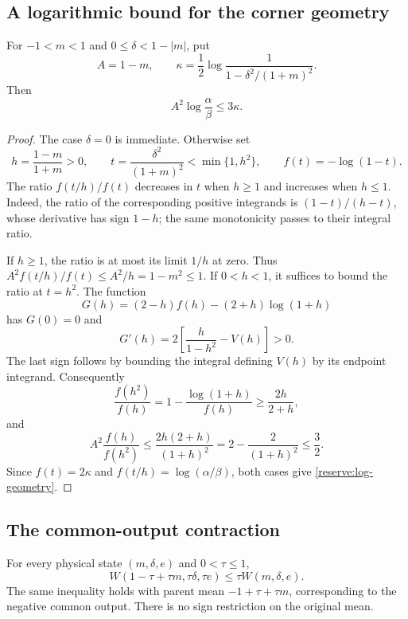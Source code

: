 \subsection{A logarithmic bound for the corner geometry}

\begin{lemma}
\label{reserve:geometry}
For $-1<m<1$ and $0\le\delta<1-|m|$, put
\[
 A=1-m,\qquad
 \kappa=\frac12\log\frac1{1-\delta^2/(1+m)^2}.
\]
Then
\begin{equation}
 A^2\log\frac\alpha\beta\le3\kappa.
 \label{reserve:log-geometry}
\end{equation}
\end{lemma}

\begin{proof}
The case $\delta=0$ is immediate.  Otherwise set
\[
 h=\frac{1-m}{1+m}>0,\qquad
 t=\frac{\delta^2}{(1+m)^2}<\min\{1,h^2\},\qquad
 f(t)=-\log(1-t).
\]
The ratio $f(t/h)/f(t)$ decreases in $t$ when $h\ge1$ and
increases when $h\le1$.  Indeed, the ratio of the corresponding
positive integrands is $(1-t)/(h-t)$, whose derivative has sign
$1-h$; the same monotonicity passes to their integral ratio.

If $h\ge1$, the ratio is at most its limit $1/h$ at zero.
Thus $A^2f(t/h)/f(t)\le A^2/h=1-m^2\le1$.
If $0<h<1$, it suffices to bound the ratio at $t=h^2$.
The function
\[
 G(h)=(2-h)f(h)-(2+h)\log(1+h)
\]
has $G(0)=0$ and
\[
 G'(h)=2\left[\frac h{1-h^2}-V(h)\right]>0.
\]
The last sign follows by bounding the integral defining $V(h)$
by its endpoint integrand.  Consequently
\[
 \frac{f(h^2)}{f(h)}
 =1-\frac{\log(1+h)}{f(h)}\ge\frac{2h}{2+h},
\]
and
\[
 A^2\frac{f(h)}{f(h^2)}
 \le\frac{2h(2+h)}{(1+h)^2}
 =2-\frac2{(1+h)^2}\le\frac32.
\]
Since $f(t)=2\kappa$ and $f(t/h)=\log(\alpha/\beta)$,
both cases give \eqref{reserve:log-geometry}.
\end{proof}

\subsection{The common-output contraction}

\begin{lemma}
\label{reserve:corner}
For every physical state $(m,\delta,e)$ and $0<\tau\le1$,
\begin{equation}
 W(1-\tau+\tau m,\tau\delta,\tau e)
 \le\tau W(m,\delta,e).
 \label{reserve:plus-corner}
\end{equation}
The same inequality holds with parent mean $-1+\tau+\tau m$,
corresponding to the negative common output.  There is no sign
restriction on the original mean.
\end{lemma}

